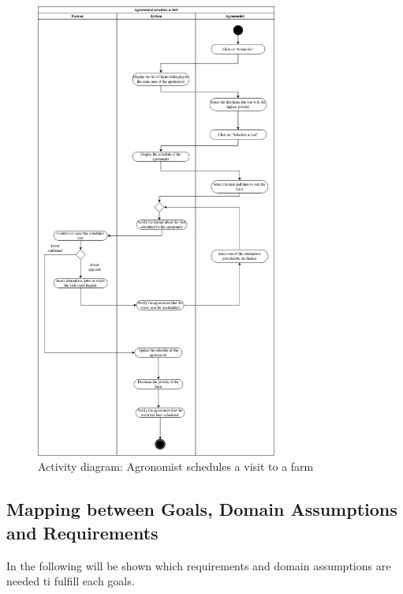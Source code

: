 \documentclass[10pt]{report}
\begin{document}
\begin{figure}[H]
    \centering
    \includegraphics[width=300px]{ActivityDiagrams/BookingFromA.jpg}
    \caption{Activity diagram: Agronomist schedules a visit to a farm}
\end{figure}
\subsection{Mapping between Goals, Domain Assumptions and Requirements}
In the following will be shown which requirements and domain assumptions are needed ti fulfill each goals.\\
\end{document}
